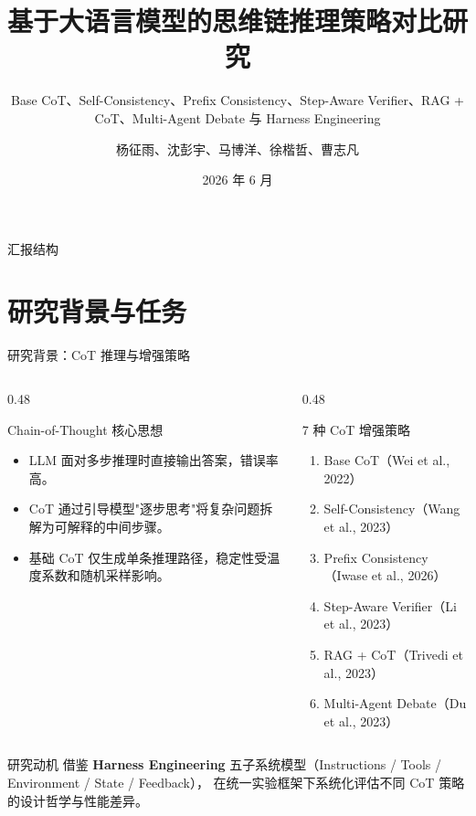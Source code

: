 \documentclass[10pt,aspectratio=169]{beamer}
\title[nlp-cot]{基于大语言模型的思维链推理策略对比研究}
\subtitle{Base CoT、Self-Consistency、Prefix Consistency、Step-Aware Verifier、RAG + CoT、Multi-Agent Debate 与 Harness Engineering}
\author[nlp-cot]{杨征雨、沈彭宇、马博洋、徐楷哲、曹志凡}
\institute[ZJU]{浙江大学 \quad 自然语言处理导论课程大作业}
\date{2026 年 6 月}
\newcommand{\tightitems}{\setlength{\itemsep}{0.24em}}
\begin{document}
\begin{frame}
  \titlepage
\end{frame}

\begin{frame}{汇报结构}
  \tableofcontents[hideallsubsections]
\end{frame}

\section{研究背景与任务}

\begin{frame}{研究背景：CoT 推理与增强策略}
  \begin{columns}[T,onlytextwidth]
    \begin{column}{0.48\textwidth}
      \begin{block}{Chain-of-Thought 核心思想}
        \begin{itemize}
          \tightitems
          \item LLM 面对多步推理时直接输出答案，错误率高。
          \item CoT 通过引导模型"逐步思考"将复杂问题拆解为可解释的中间步骤。
          \item 基础 CoT 仅生成单条推理路径，稳定性受温度系数和随机采样影响。
        \end{itemize}
      \end{block}
    \end{column}
    \begin{column}{0.48\textwidth}
      \begin{block}{7 种 CoT 增强策略}
        \small
        \begin{enumerate}
          \tightitems
          \item Base CoT（Wei et al., 2022）
          \item Self-Consistency（Wang et al., 2023）
          \item Prefix Consistency（Iwase et al., 2026）
          \item Step-Aware Verifier（Li et al., 2023）
          \item RAG + CoT（Trivedi et al., 2023）
          \item Multi-Agent Debate（Du et al., 2023）
        \end{enumerate}
      \end{block}
    \end{column}
  \end{columns}
  \vspace{0.3em}
  \begin{alertblock}{研究动机}
    借鉴 \textbf{Harness Engineering} 五子系统模型（Instructions / Tools / Environment / State / Feedback），
    在统一实验框架下系统化评估不同 CoT 策略的设计哲学与性能差异。
  \end{alertblock}
\end{frame}
\end{document}
